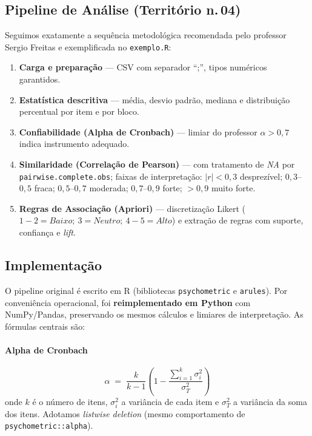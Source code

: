\documentclass[12pt,a4paper]{article}
\begin{document}
\subsection{Pipeline de Análise (Território n.\,04)}
Seguimos exatamente a sequência metodológica recomendada pelo professor Sergio Freitas
e exemplificada no \texttt{exemplo.R}:

\begin{enumerate}[label=\textbf{\arabic*.}, leftmargin=*, itemsep=2pt]
  \item \textbf{Carga e preparação} --- CSV com separador ``;'', tipos numéricos garantidos.
  \item \textbf{Estatística descritiva} --- média, desvio padrão, mediana e distribuição
        percentual por item e por bloco.
  \item \textbf{Confiabilidade (Alpha de Cronbach)} --- limiar do professor
        $\alpha > 0{,}7$ indica instrumento adequado.
  \item \textbf{Similaridade (Correlação de Pearson)} --- com tratamento de \emph{NA}
        por \texttt{pairwise.complete.obs}; faixas de interpretação: $|r| < 0{,}3$
        desprezível; $0{,}3$--$0{,}5$ fraca; $0{,}5$--$0{,}7$ moderada; $0{,}7$--$0{,}9$
        forte; $> 0{,}9$ muito forte.
  \item \textbf{Regras de Associação (Apriori)} --- discretização Likert
        ($1{-}2 = \textit{Baixo};\ 3 = \textit{Neutro};\ 4{-}5 = \textit{Alto}$) e
        extração de regras com suporte, confiança e \emph{lift}.
\end{enumerate}

\subsection{Implementação}
O pipeline original é escrito em R (bibliotecas \texttt{psychometric} e \texttt{arules}).
Por conveniência operacional, foi \textbf{reimplementado em Python} com NumPy/Pandas,
preservando os mesmos cálculos e limiares de interpretação. As fórmulas centrais são:

\paragraph{Alpha de Cronbach}
\[
\alpha \;=\; \frac{k}{k-1}\left(1 - \frac{\sum_{i=1}^{k}\sigma^{2}_{i}}{\sigma^{2}_{T}}\right)
\]
onde $k$ é o número de itens, $\sigma^{2}_{i}$ a variância de cada item e $\sigma^{2}_{T}$
a variância da soma dos itens. Adotamos \emph{listwise deletion} (mesmo comportamento
de \texttt{psychometric::alpha}).
\end{document}
